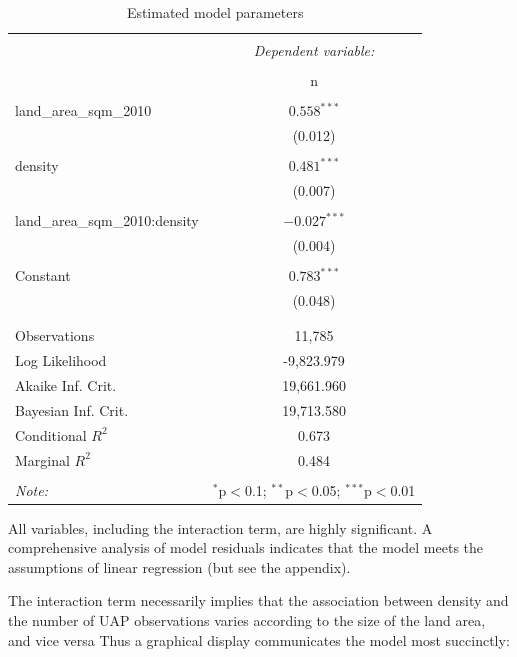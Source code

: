 \documentclass[]{elsarticle} %
\begin{document}
\begin{table}[!htbp] \centering 
  \caption{Estimated model parameters} 
  \label{} 
\begin{tabular}{@{\extracolsep{5pt}}lc}
\\[-1.8ex]\hline 
\hline \\[-1.8ex] 
 & \multicolumn{1}{c}{\textit{Dependent variable:}} \\ 
\cline{2-2} 
\\[-1.8ex] & \multicolumn{1}{c}{n} \\ 
\hline \\[-1.8ex] 
 land\_area\_sqm\_2010 & $0.558^{***}$ \\ 
  & (0.012) \\ 
  & \\ 
 density & $0.481^{***}$ \\ 
  & (0.007) \\ 
  & \\ 
 land\_area\_sqm\_2010:density & $-0.027^{***}$ \\ 
  & (0.004) \\ 
  & \\ 
 Constant & $0.783^{***}$ \\ 
  & (0.048) \\ 
  & \\ 
\hline \\[-1.8ex] 
Observations & \multicolumn{1}{c}{11,785} \\ 
Log Likelihood & \multicolumn{1}{c}{-9,823.979} \\ 
Akaike Inf. Crit. & \multicolumn{1}{c}{19,661.960} \\ 
Bayesian Inf. Crit. & \multicolumn{1}{c}{19,713.580} \\ 
Conditional $R^2$ & \multicolumn{1}{c}{0.673} \\ 
Marginal $R^2$ & \multicolumn{1}{c}{0.484} \\ 
\hline 
\hline \\[-1.8ex] 
\textit{Note:}  & \multicolumn{1}{r}{$^{*}$p$<$0.1; $^{**}$p$<$0.05; $^{***}$p$<$0.01} \\
\end{tabular} 
\end{table}

All variables, including the interaction term, are highly significant. A
comprehensive analysis of model residuals indicates that the model meets
the assumptions of linear regression (but see the appendix).

The interaction term necessarily implies that the association between
density and the number of UAP observations varies according to the size
of the land area, and vice versa Thus a graphical display communicates
the model most succinctly:
\end{document}
